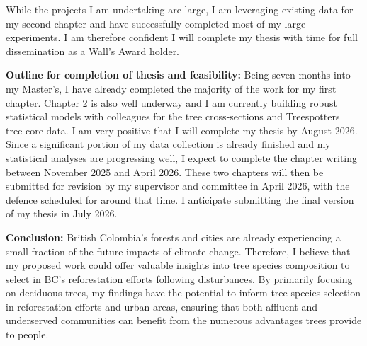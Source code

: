 \documentclass[11pt,letter]{article}
\begin{document}
While the projects I am undertaking are large, I am leveraging existing data for my second chapter and have successfully completed most of my large experiments. I am therefore confident I will complete my thesis with time for full dissemination as a Wall's Award holder. 
\par
\textbf{Outline for completion of thesis and feasibility:} Being seven months into my Master’s, I have already completed the majority of the work for my first chapter. Chapter 2 is also well underway and I am currently building robust statistical models with colleagues for the tree cross-sections and Treespotters tree-core data. 
I am very positive that I will complete my thesis by August 2026. Since a significant portion of my data collection is already finished and my statistical analyses are progressing well, I expect to complete the chapter writing between November 2025 and April 2026. These two chapters will then be submitted for revision by my supervisor and committee in April 2026, with the defence scheduled for around that time. I anticipate submitting the final version of my thesis in July 2026.

\textbf{Conclusion:} British Colombia’s forests and cities are already experiencing a small fraction of the future impacts of climate change. Therefore, I believe that my proposed work could offer valuable insights into tree species composition to select in BC's reforestation efforts following disturbances. By primarily focusing on deciduous trees, my findings have the potential to inform tree species selection in reforestation efforts and urban areas, ensuring that both affluent and underserved communities can benefit from the numerous advantages trees provide to people.

\end{document}
